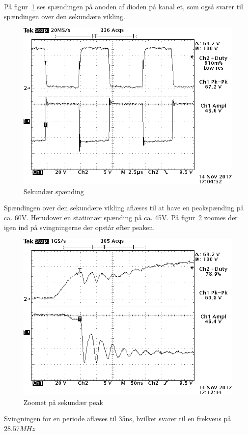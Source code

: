På figur~\ref{fig:sek} ses spændingen på anoden af dioden på kanal et, som også svarer til spændingen over den sekundære vikling.
\begin{figure}[H]
	\center
	\includegraphics[max width=0.7\linewidth]{../dokumentation/tex/2iteration/billeder/Realisering/Transformator_sekundar.png}
	\caption{Sekundær spænding}
	\label{fig:sek}
\end{figure}
Spændingen over den sekundære vikling aflæses til at have en peakspænding på ca. 60V. Herudover en stationær spænding på ca. 45V. 
På figur~\ref{fig:sekzoom} zoomes der igen ind på svingningerne der opstår efter peaken.
\begin{figure}[H]
	\center
	\includegraphics[max width=0.7\linewidth]{../dokumentation/tex/2iteration/billeder/Realisering/Transformator_sekundarzoomrise.png}
	\caption{Zoomet på sekundær peak}
	\label{fig:sekzoom}
\end{figure}
Svingningen for en periode aflæses til 35ns, hvilket svarer til en frekvens på $28.57MHz$

